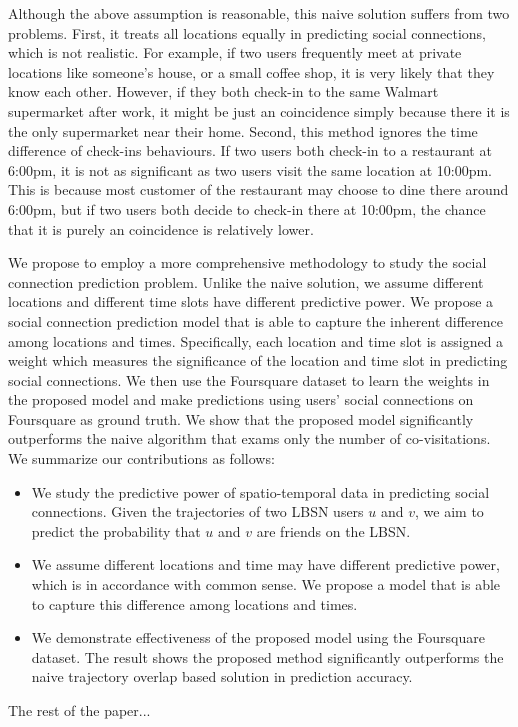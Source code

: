 Although the above assumption is reasonable, this naive solution suffers from two problems. First, it treats all locations equally in predicting social connections, which is not realistic. For example, if two users frequently meet at private locations like someone's house, or a small coffee shop, it is very likely that they know each other. However, if they both check-in to the same Walmart supermarket after work, it might be just an coincidence simply because there it is the only supermarket near their home. Second, this method ignores the time difference of check-ins behaviours. If two users both check-in to a restaurant at 6:00pm, it is not as significant as two users visit the same location at 10:00pm. This is because most customer of the restaurant may choose to dine there around 6:00pm, but if two users both decide to check-in there at 10:00pm, the chance that it is purely an coincidence is relatively lower.

We propose to employ a more comprehensive methodology to study the social connection prediction problem. Unlike the naive solution, we assume different locations and different time slots have different predictive power. We propose a social connection prediction model that is able to capture the inherent difference among locations and times. Specifically, each location and time slot is assigned a weight which measures the significance of the location and time slot in predicting social connections. We then use the Foursquare dataset to learn the weights in the proposed model and make predictions using users' social connections on Foursquare as ground truth. We show that the proposed model significantly outperforms the naive algorithm that exams only the number of co-visitations. We summarize our contributions as follows:
\begin{itemize}

\item We study the predictive power of spatio-temporal data in predicting social connections. Given the trajectories of two LBSN users $u$ and $v$, we aim to predict the probability that $u$ and $v$ are friends on the LBSN.

\item We assume different locations and time may have different predictive power, which is in accordance with common sense. We propose a model that is able to capture this difference among locations and times. 

\item We demonstrate effectiveness of the proposed model using the Foursquare dataset. The result shows the proposed method significantly outperforms the naive trajectory overlap based solution in prediction accuracy.

\end{itemize} 

The rest of the paper...

  